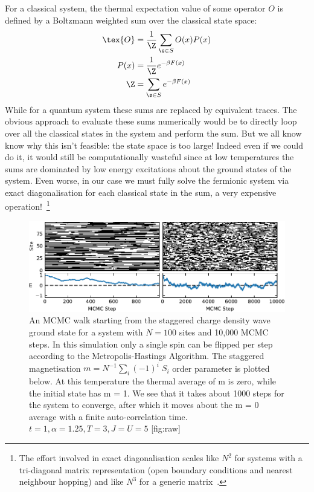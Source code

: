 For a classical system, the thermal expectation value of some operator \(O\) is defined by a Boltzmann weighted sum over the classical state space: \[\begin{aligned}
    \tex{O} &= \frac{1}{\Z} \sum_{\s \in S} O(x) P(x) \\
    P(x) &= \frac{1}{\Z} e^{-\beta F(x)} \\
    \Z &= \sum_{\s \in S} e^{-\beta F(x)}\end{aligned}\] While for a quantum system these sums are replaced by equivalent traces. The obvious approach to evaluate these sums numerically would be to directly loop over all the classical states in the system and perform the sum. But we all know know why this isn't feasible: the state space is too large! Indeed even if we could do it, it would still be computationally wasteful since at low temperatures the sums are dominated by low energy excitations about the ground states of the system. Even worse, in our case we must fully solve the fermionic system via exact diagonalisation for each classical state in the sum, a very expensive operation!~\footnote{The effort involved in exact diagonalisation scales like \(N^2\) for systems with a tri-diagonal matrix representation (open boundary conditions and nearest neighbour hopping) and like \(N^3\) for a generic matrix~\autocite{bolchQueueingNetworksMarkov2006,usmaniInversionTridiagonalJacobi1994}.}

\begin{figure}
\hypertarget{fig:raw}{%
\centering
\includegraphics{figs/lsr/raw_steps_single_flip.pdf}
\caption{An MCMC walk starting from the staggered charge density wave ground state for a system with \(N = 100\) sites and 10,000 MCMC steps. In this simulation only a single spin can be flipped per step according to the Metropolis-Hastings Algorithm. The staggered magnetisation \(m = N^{-1} \sum_i (-1)^i \; S_i\) order parameter is plotted below. At this temperature the thermal average of m is zero, while the initial state has m = 1. We see that it takes about 1000 steps for the system to converge, after which it moves about the m = 0 average with a finite auto-correlation time. \(t = 1, \alpha = 1.25, T = 3, J = U = 5\) \protect\hypertarget{fig:raw}{}{{[}fig:raw{]}}}\label{fig:raw}
}
\end{figure}

